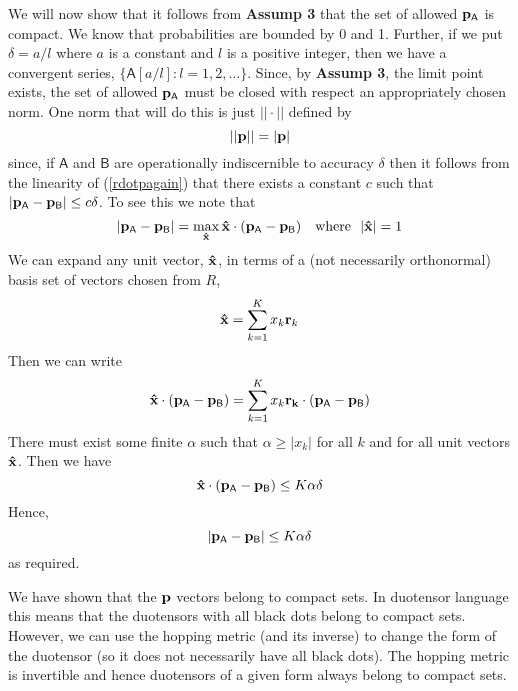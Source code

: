 \documentclass[10pt]{article}
\begin{document}
We will now show that it follows from {\bf Assump 3} that the set of allowed ${\bf p}_\mathsf{A}$ is compact.  We know that probabilities are bounded by 0 and 1.  Further, if we put $\delta=a/l$ where $a$ is a constant and $l$ is a positive integer, then we have a convergent series, $\{\mathsf{A}[a/l]: l=1, 2, \dots\}$. Since, by {\bf Assump 3}, the limit point exists, the set of allowed ${\bf p}_\mathsf{A}$ must be closed with respect an appropriately chosen norm.  One norm that will do this is just $||\cdot ||$ defined by
\begin{equation}
||{\bf p}||=|{\bf p}|
\end{equation}
since, if $\mathsf A$ and $\mathsf B$ are operationally indiscernible to accuracy $\delta$ then it follows from the linearity of (\ref{rdotpagain}) that there exists a constant $c$ such that $|{\bf p}_\mathsf{A}-{\bf p}_\mathsf{B}|\leq c\delta$. To see this we note that
\begin{equation}
|{\bf p}_\mathsf{A} - {\bf p}_\mathsf{B}| = \max_{\bf \hat x} {\bf \hat x} \cdot ({\bf p}_\mathsf{A} - {\bf p}_\mathsf{B}) ~~~\text{where}~~|{\bf \hat x}|=1
\end{equation}
We can expand any unit vector, ${\bf \hat x}$, in terms of a (not necessarily orthonormal) basis set of vectors chosen from $R$,
\begin{equation}
{\bf \hat x}= \sum_{k=1}^K x_k {\bf r}_k
\end{equation}
Then we can write
\begin{equation}
{\bf \hat x} \cdot ({\bf p}_\mathsf{A} - {\bf p}_\mathsf{B}) = \sum_{k=1}^K x_k {\bf r_k} \cdot ({\bf p}_\mathsf{A} - {\bf p}_\mathsf{B})
\end{equation}
There must exist some finite $\alpha$ such that $\alpha\geq |x_k|$ for all $k$ and for all unit vectors ${\bf \hat x}$.  Then we have
\begin{equation}
{\bf \hat x} \cdot ({\bf p}_\mathsf{A} - {\bf p}_\mathsf{B}) \leq K \alpha \delta
\end{equation}
Hence,
\begin{equation}
|{\bf p}_\mathsf{A} - {\bf p}_\mathsf{B}| \leq K\alpha \delta
\end{equation}
as required.

We have shown that the ${\bf p}$ vectors belong to compact sets.  In duotensor language this means that the duotensors with all black dots belong to compact sets. However, we can use the hopping metric (and its inverse) to change the form of the duotensor (so it does not necessarily have all black dots).  The hopping metric is invertible and hence duotensors of a given form always belong to compact sets.
\end{document}
